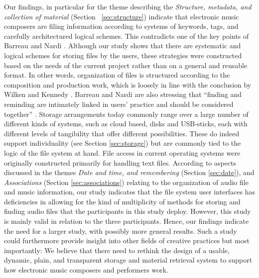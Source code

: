 \documentclass[runningheads,a4paper]{cmmr2023}
\begin{document}
Our findings, in particular for the theme describing the \emph{Structure, metadata, and collection of material} (Section ~\ref{sec:structure}) indicate that electronic music composers are filing information according to systems of keywords, tags, and carefully architectured logical schemes.
This contradicts one of the key points of Barreau and Nardi \cite{Barreau1995}. Although our study shows that there are systematic and logical schemes for storing files by the users, these strategies were constructed based on the needs of the current project rather than on a general and reusable format. In other words, organization of files is structured according to the composition and production work, which is loosely in line with the conclusion by Wilken and Kennedy \cite{Wilken2021}. Barreau and Nardi are also stressing that “finding and reminding are intimately linked in users' practice and should be considered together” \cite{Barreau1995}. 
Storage arrangements today commonly range over a large number of different kinds of systems, such as cloud based, disks and USB-sticks, each with different levels of tangibility that offer different possibilities. These do indeed support individuality (see Section \ref{sec:storage}) but are commonly tied to the logic of the file system at hand. 
File access in current operating systems were originally constructed primarily for handling text files. 
According to aspects discussed in the themes \emph{Date and time, and remembering} (Section \ref{sec:date}), and \emph{Associations} (Section \ref{sec:associations}) relating to the organization of audio file and music information, our study indicates that the file system user interfaces has deficiencies in allowing for the kind of multiplicity of methods for storing and finding audio files that the participants in this study deploy. 
However, this study is mainly valid in relation to the three participants. Hence, our findings indicate the need for a larger study, with possibly more general results. Such a study could furthermore provide insight into other fields of creative practices but most importantly: We believe that there need to rethink the design of a usable, dynamic, plain, and transparent storage and material retrieval system to support how electronic music composers and performers work.
\end{document}
